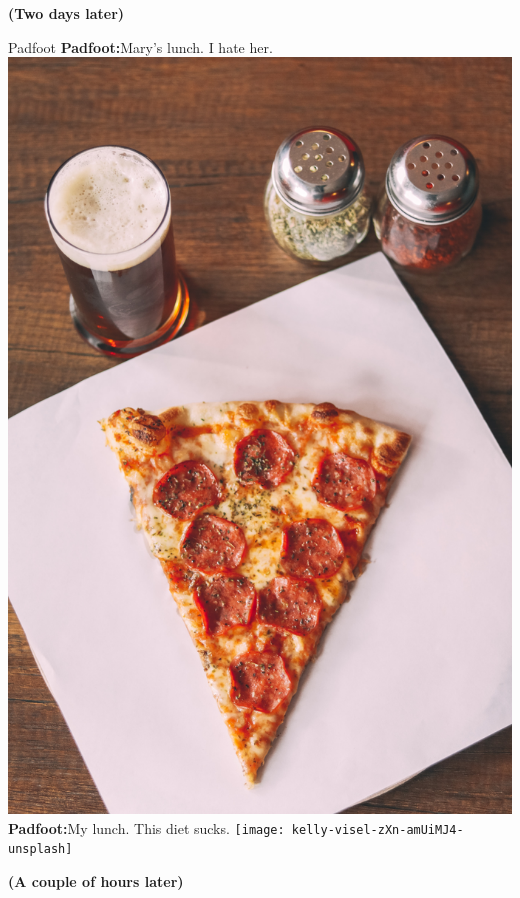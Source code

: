 \documentclass[12pt,twoside,openright]{memoir}
\begin{document}
\textbf{(Two days later)} 

Padfoot\newline
\textbf{Padfoot:}Mary's lunch. I hate her.{\centering\includegraphics[width=\textwidth]{peter-bravo-de-los-rios-OklpRh8-Sns-unsplash}}
\textbf{Padfoot:}My lunch. This diet sucks.  {\centering\texttt{[image: kelly-visel-zXn-amUiMJ4-unsplash]}}
 

\textbf{(A couple of hours later)} 
\end{document}
